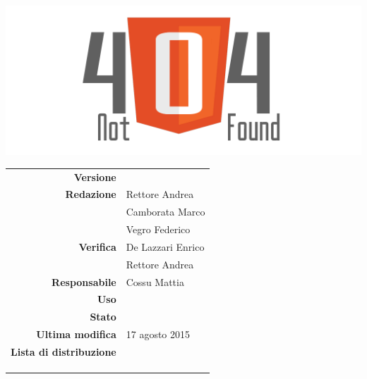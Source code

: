 \thispagestyle{empty}

\begin{titlepage}

	\begin{center}
	\begin{Huge}
		\textbf{\gruppo} \\
	\end{Huge}
	\vspace{0.5cm}
	\begin{Large}
		\textbf{\capitolato}
	\end{Large}
	
	\vspace{1cm}

	\includegraphics[scale=0.35]{../logo/logo404_Extends.png}
	\vspace{1cm}
	\begin{Huge}
		\textbf{\titDoc}
	\end{Huge}
	
	\vspace{1cm}
	
	\begin{table}[h]
	\begin{center}
	\begin{tabular}{r | l}
		\textbf{Versione} & \versione \\
		\textbf{Redazione} & Rettore Andrea \\ 
			& Camborata Marco \\ 
			& Vegro Federico \\
		\textbf{Verifica} & De Lazzari Enrico \\ 
			& Rettore Andrea \\ 
		\textbf{Responsabile} & Cossu Mattia \\
		\textbf{Uso} & \uso \\
		\textbf{Stato} & \stato \\
		\textbf{Ultima modifica} & 17 agosto 2015 \\
		\textbf{Lista di distribuzione} & \gruppo \\ 
			& \Vardanega \\
			& \Cardin \\
			& \Zucchetti \\
	\end{tabular}
	\end{center}
	\end{table}
	\end{center}
\end{titlepage}